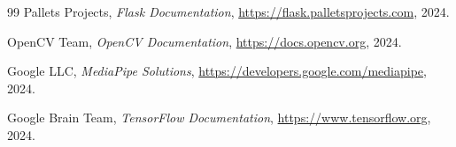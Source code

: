 \begin{thebibliography}{99}
Pallets Projects, \textit{Flask Documentation}, \url{https://flask.palletsprojects.com}, 2024.

OpenCV Team, \textit{OpenCV Documentation}, \url{https://docs.opencv.org}, 2024.

Google LLC, \textit{MediaPipe Solutions}, \url{https://developers.google.com/mediapipe}, 2024.

Google Brain Team, \textit{TensorFlow Documentation}, \url{https://www.tensorflow.org}, 2024.

\end{thebibliography}